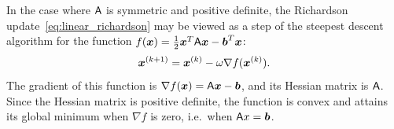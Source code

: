 \begin{remark}
    \label{remark:linear_link_optimization}
    In the case where $\mathsf A$ is symmetric and positive definite,
    the Richardson update~\eqref{eq:linear_richardson} may be viewed as a step of the steepest descent algorithm
    for the function $f(\mathbf{\boldsymbol{x}}) = \frac{1}{2} \mathbf{\boldsymbol{x}}^T \mathsf A \mathbf{\boldsymbol{x}} - \mathbf{\boldsymbol{b}}^T \mathbf{\boldsymbol{x}}$:
    \begin{equation}
        \label{eq:linear_richardson_gradient}
        \mathbf{\boldsymbol{x}}^{(k+1)} = \mathbf{\boldsymbol{x}}^{(k)} - \omega \nabla f(\mathbf{\boldsymbol{x}}^{(k)}).
    \end{equation}
    The gradient of this function is $\nabla f(\mathbf{\boldsymbol{x}}) = \mathsf A \mathbf{\boldsymbol{x}} - \mathbf{\boldsymbol{b}}$,
    and its Hessian matrix is $\mathsf A$.
    Since the Hessian matrix is positive definite, the function is convex
    and attains its global minimum when $\nabla f$ is zero,
    i.e.\ when $\mathsf A x = \mathbf{\boldsymbol{b}}$.
\end{remark}

